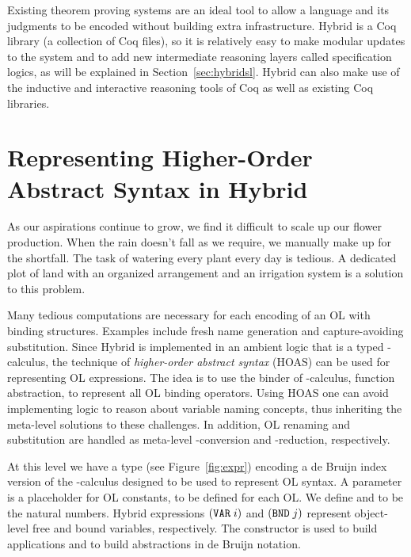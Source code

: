 Existing theorem proving systems are an ideal tool to allow a language and its judgments to be encoded without building extra infrastructure. Hybrid is a Coq library (a collection of Coq files), so it is relatively easy to make modular updates to the system and to add new intermediate reasoning layers called specification logics, as will be explained in Section~\ref{sec:hybridsl}.
Hybrid can also make use of the inductive and interactive reasoning tools of Coq as well as existing Coq libraries.

\section{Representing Higher-Order Abstract Syntax in Hybrid}
\label{sec:hybridhoas}

\begin{sidestory}
As our aspirations continue to grow, we find it difficult to scale up our flower production. When the rain doesn't fall as we require, we manually make up for the shortfall. The task of watering every plant every day is tedious. A dedicated plot of land with an organized arrangement and an irrigation system is a solution to this problem.
\end{sidestory}

Many tedious computations are necessary for each encoding of an OL with binding structures. Examples include fresh name generation and capture-avoiding substitution. Since Hybrid is implemented in an ambient logic that is a typed \lambda-calculus, the technique of \emph{higher-order abstract syntax} (HOAS) can be used for representing OL expressions. The idea is to use the binder of \lambda-calculus, function abstraction, to represent all OL binding operators. Using HOAS one can avoid implementing logic to reason about variable naming concepts, thus inheriting the meta-level solutions to these challenges. In addition, OL renaming and substitution are handled as meta-level \alpha-conversion and \beta-reduction, respectively.

At this level we have a type  (see Figure~\ref{fig:expr}) encoding a de Bruijn index version of the \lambda-calculus designed to be used to represent OL syntax. A parameter  is a placeholder for OL constants, to be defined for each OL. We define  and  to be the natural numbers. Hybrid expressions $(\texttt{VAR} \; i)$ and $(\texttt{BND} \; j)$ represent object-level free and bound variables, respectively. The constructor  is used to build applications and  to build abstractions in de Bruijn notation.


